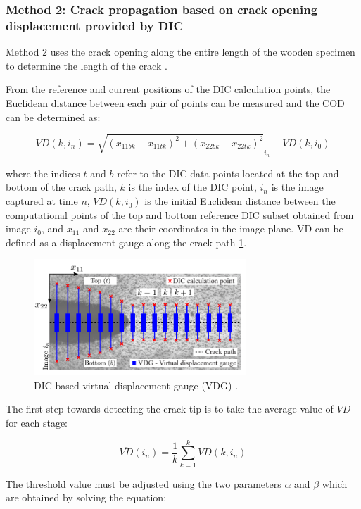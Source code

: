 \documentclass[3p,times,procedia]{elsarticle}
\begin{document}
\subsubsection{Method 2: Crack propagation based on crack opening displacement provided by DIC}

Method 2 uses the crack opening along the entire length of the wooden specimen to determine the length of the crack \citep{FilhoJ2022}.

From the reference and current positions of the DIC calculation points, the Euclidean distance between each pair of points can be measured and the COD can be determined as:

\begin{equation}
	VD(k,i_n)=\sqrt{(x_{11bk}-x_{11tk})^2 + (x_{22bk}-x_{22tk})^2}_{i_n} - VD(k,i_0)
	\label{eq:eq23}
\end{equation}

where the indices $t$ and $b$ refer to the DIC data points located at the top and bottom of the crack path, $k$ is the index of the DIC point, $i_n$ is the image captured at time $n$, $VD(k, i_0)$ is the initial Euclidean distance between the computational points of the top and bottom reference DIC subset obtained from image $i_0$, and $x_{11}$ and $x_{22}$ are their coordinates in the image plane. VD can be defined as a displacement gauge along the crack path \ref{fig:fig30}.

\begin{figure}[htp]
	\centering
	\includegraphics[width=8cm]{Figures/fig30}
	\caption{DIC-based virtual displacement gauge (VDG) \citep{FilhoJ2022}.}
	\label{fig:fig30}
\end{figure}

The first step towards detecting the crack tip is to take the average value of $VD$ for each stage:

\begin{equation}
	\overline{VD}(i_n)=\frac{1}{k} \sum_{k=1}^{k}VD(k,i_n)
	\label{eq:eq24}
\end{equation}

The threshold value must be adjusted using the two parameters $\alpha$ and $\beta$ which are obtained by solving the equation:
\end{document}

